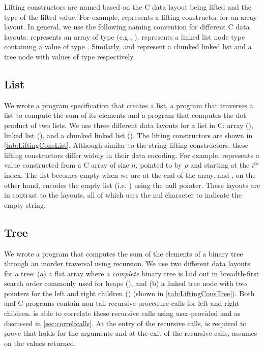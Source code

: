 Lifting constructors are named based on the C data layout being lifted
and the type of the lifted value.
For example,  represents a  lifting constructor
for an array layout.
In general, we use the following naming convention for different C data layouts:
 represents an array of type  (e.g., ).
 represents a linked list node type containing a value of type .
Similarly,  and  represent a chunked linked list and a tree node
with values of type  respectively.

\subsection{List}
\label{sec:explist}
We wrote a \SpecL{} program specification that creates a list, a
program that traverses a list to compute the sum of its elements and a program
that computes the dot product of two lists. We use three different
data layouts for a list in C: array (),
linked list (), and
a chunked linked list ().
The lifting constructors are shown in \cref{tab:LiftingConsList}.
Although similar to the string lifting constructors, these lifting
constructors differ widely in their data encoding. For example,
 represents a  value constructed
from a C array of size $n$, pointed to by $p$ and starting at the $i^{th}$ index.
The list becomes empty when we are at the end of the array.
 and , on the other hand, encodes the
empty list (i.e. ) using the null pointer.
These layouts are in contrast to the  layouts, all of which uses the nul character
to indicate the empty string.


\subsection{Tree}
\label{sec:exptree}
We wrote a \SpecL{} program that computes the sum of the elements of a binary tree
through an inorder traversal using recursion. We use two different data layouts for a tree: 
(a) a flat array where a
{\em complete} binary tree is laid out in breadth-first search order commonly used for heaps (),
and (b) a linked tree node with two pointers for the left and right children () (shown in \cref{tab:LiftingConsTree}).
Both \SpecL{} and C programs contain non-tail recursive procedure calls for left and right children.
\toolName{} is able to correlate these recursive calls using user-provided \pre{} and \post{} as discussed in \cref{sec:correlfcalls}.
At the entry of the recursive calls, \toolName{} is required to prove that \pre{} holds for the arguments
and at the exit of the recursive calls, \toolName{} assumes \post{} on the values returned.

